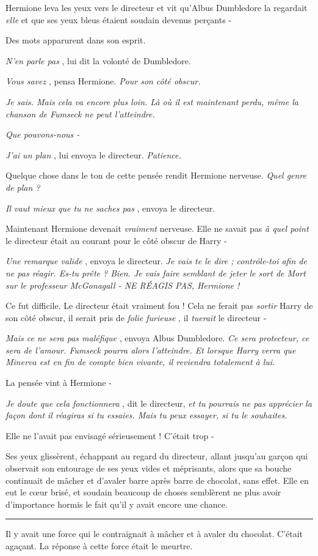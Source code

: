 Hermione leva les yeux vers le directeur et vit qu'Albus Dumbledore la regardait \emph{elle}  et que ses yeux bleus étaient soudain devenus perçants -

Des mots apparurent dans son esprit.

\emph{N'en parle pas} , lui dit la volonté de Dumbledore.

\emph{Vous savez} , pensa Hermione. \emph{Pour son côté obscur.} 

\emph{Je sais. Mais cela va encore plus loin. Là où il est maintenant perdu, même la chanson de Fumseck ne peut l'atteindre.} 

\emph{Que pouvons-nous -} 

\emph{J'ai un plan} , lui envoya le directeur. \emph{Patience.} 

Quelque chose dans le ton de cette pensée rendit Hermione nerveuse. \emph{Quel genre de plan ?} 

\emph{Il vaut mieux que tu ne saches pas} , envoya le directeur.

Maintenant Hermione devenait \emph{vraiment } nerveuse. Elle ne savait pas \emph{à quel point}  le directeur était au courant pour le côté obscur de Harry -

\emph{Une remarque valide} , envoya le directeur. \emph{Je vais te le dire ; contrôle-toi afin de ne pas réagir. Es-tu prête ? Bien. Je vais faire semblant de jeter le sort de Mort sur le professeur McGonagall - NE RÉAGIS PAS, Hermione !} 

Ce fut difficile. Le directeur était vraiment fou ! Cela ne ferait pas \emph{sortir}  Harry de son côté obscur, il serait pris de \emph{folie furieuse} , il \emph{tuerait}  le directeur -

\emph{Mais ce ne sera pas maléfique} , envoya Albus Dumbledore. \emph{Ce sera protecteur, ce sera de l'amour. Fumseck pourra alors l'atteindre. Et lorsque Harry verra que Minerva est en fin de compte bien vivante, il reviendra totalement à lui.} 

La pensée vint à Hermione -

\emph{Je doute que cela fonctionnera} , dit le directeur, \emph{et tu pourrais ne pas apprécier la façon dont il réagiras si tu essaies. Mais tu peux essayer, si tu le souhaites.} 

Elle ne l'avait pas envisagé sérieusement ! C'était trop -

Ses yeux glissèrent, échappant au regard du directeur, allant jusqu'au garçon qui observait son entourage de ses yeux vides et méprisants, alors que sa bouche continuait de mâcher et d'avaler barre après barre de chocolat, sans effet. Elle en eut le cœur brisé, et soudain beaucoup de choses semblèrent ne plus avoir d'importance hormis le fait qu'il y avait encore une chance.
\par\noindent\rule{\textwidth}{0.4pt}
Il y avait une force qui le contraignait à mâcher et à avaler du chocolat. C'était agaçant. La réponse à cette force était le meurtre.

